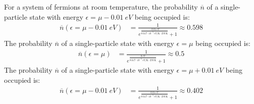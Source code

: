\documentclass{article}
\begin{document}
\clearpage

For a system of fermions at room temperature, the probability $\overline{n}$ of a single-particle state with energy $\epsilon = \mu - 0.01~\unit{eV}$ being occupied is:
\begin{equation}
    \begin{split}
        \overline{n}\left(\epsilon = \mu - 0.01~\unit{eV}\right) & = \frac{1}{e^{\frac{-0.01~\unit{eV}}{8.617 \cdot 10^{-5}~\unit{eV\per\kelvin} \cdot 293~\unit{\kelvin}}} + 1} \approx 0.598
    \end{split}
\end{equation}
The probability $\overline{n}$ of a single-particle state with energy $\epsilon = \mu$ being occupied is:
\begin{equation}
    \begin{split}
        \overline{n}\left(\epsilon = \mu\right) & = \frac{1}{e^{\frac{0~\unit{eV}}{8.617 \cdot 10^{-5}~\unit{eV\per\kelvin} \cdot 293~\unit{\kelvin}}} + 1} \approx 0.5
    \end{split}
\end{equation}
The probability $\overline{n}$ of a single-particle state with energy $\epsilon = \mu + 0.01~\unit{eV}$ being occupied is:
\begin{equation}
    \begin{split}
        \overline{n}\left(\epsilon = \mu - 0.01~\unit{eV}\right) & = \frac{1}{e^{\frac{0.01~\unit{eV}}{8.617 \cdot 10^{-5}~\unit{eV\per\kelvin} \cdot 293~\unit{\kelvin}}} + 1} \approx 0.402
    \end{split}
\end{equation}

\clearpage
\end{document}
